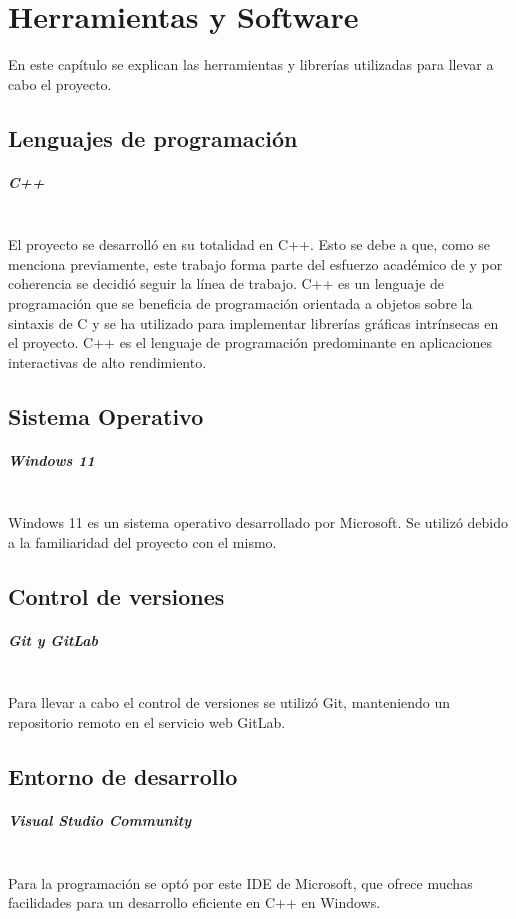 \chapter{Herramientas y Software}
\label{chap:hs}
En este capítulo se explican las herramientas y librerías utilizadas para llevar a cabo el proyecto.
\section{Lenguajes de programación}
    \paragraph{C++}~\\
    El proyecto se desarrolló en su totalidad en C++. Esto se debe a que, como se menciona previamente, este trabajo forma parte del esfuerzo académico de \citeauthor{IglesiasGuitian2022} y por coherencia se decidió seguir la línea de trabajo.
C++ es un lenguaje de programación que se beneficia de programación orientada a objetos sobre la sintaxis de C y se ha utilizado para implementar librerías gráficas intrínsecas en el proyecto. C++ es el lenguaje de programación predominante en aplicaciones interactivas de alto rendimiento.

\section{Sistema Operativo}
\paragraph{Windows 11}~\\
Windows 11 es un sistema operativo desarrollado por Microsoft. Se utilizó debido a la familiaridad del proyecto con el mismo.
\section{Control de versiones}
    \paragraph{Git y GitLab}~\\
Para llevar a cabo el control de versiones se utilizó Git, manteniendo un repositorio remoto en el servicio web GitLab.
\section{Entorno de desarrollo}
    \paragraph{Visual Studio Community}~\\
Para la programación se optó por este IDE de Microsoft, que ofrece muchas facilidades para un desarrollo eficiente en C++ en Windows.
